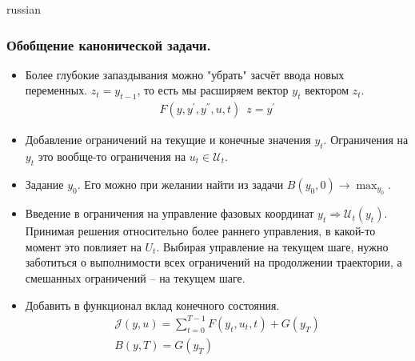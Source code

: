 \documentclass{article}
\begin{document}
\begin{otherlanguage*}{russian}
\subsubsection*{Обобщение канонической задачи.}
\begin{itemize}
\item Более глубокие запаздывания можно "убрать" засчёт ввода новых переменных. $ z_t = y_{t-1} $, то есть мы расширяем вектор $ y_t $ вектором $ z_t $. 
\begin{align*}
F(y, y^{'}, y^{''}, u, t) \,\,\, z = y^{'}
\end{align*}
\item Добавление ограничений на текущие и конечные значения $ y_t $. Ограничения на $ y_t $ это вообще-то ограничения на $ u_t \in \mathcal{U}_t $. 
\item Задание $ y_0 $. Его можно при желании найти из задачи $ B(y_0, 0) \rightarrow \max_{y_0} $.  
\item Введение в ограничения на управление фазовых координат $ y_t \Rightarrow \mathcal{U}_t (y_t) $. Принимая решения относительно более раннего управления, в какой-то момент это повлияет на $ U_t $. Выбирая управление на текущем шаге, нужно заботиться о выполнимости всех ограничений на продолжении траектории, а смешанных ограничений -- на текущем шаге. 
\item Добавить в функционал вклад конечного состояния. 
\begin{align*}
\mathcal{J} (y, u) = \sum_{t=0}^{T-1} F(y_t, u_t, t) + G(y_T) \\
B(y, T) = G(y_T) 
\end{align*}

\end{itemize}
\end{otherlanguage*}
\end{document}
